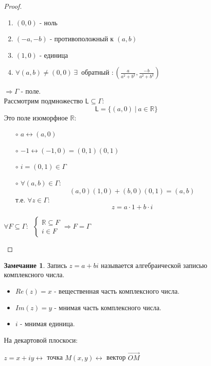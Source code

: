 \documentclass[a4paper, 12pt]{article}
\newcommand{\R}{\mathbb R}
\theoremstyle{definition}
\newtheorem*{remark}{Замечание}
\begin{document}
\begin{proof}
\begin{itemize}
\begin{enumerate}
        \item $(0,0)$ - ноль
        \item $(-a, -b)$ - противоположный к $(a, b)$
        \item $(1, 0)$ - единица
        \item $\forall (a, b) \neq (0, 0) \ \exists \ \text{ обратный }: (\frac{a}{a^2+b^2}, \frac{-b}{a^2+b^2})$
      \end{enumerate} $\Longrightarrow \Gamma$ - поле.\\
      Рассмотрим подмножество $\mathsf{L} \subseteq \Gamma: $  
      $$\mathsf{L}  = \{(a, 0) \ | \ a \in \R \}$$   
      Это поле изоморфное $\R:$
      \begin{itemize}
        \item[$\circ$] $a\longleftrightarrow (a, 0)$
        \item[$\circ$] $-1 \longleftrightarrow (-1, 0) = (0, 1)(0, 1)$
        \item[$\circ$] $i = (0, 1) \in \Gamma$
        \item[$\circ$] $\forall (a, b) \in \Gamma: $
        $$(a, 0)(1, 0) + (b, 0)(0, 1) = (a, b)$$
        т.е. $\forall z \in \Gamma:$ 
        $$z = a \cdot 1 + b \cdot i$$
      \end{itemize}
      $\forall F \subseteq \Gamma: \ $
         $\begin{cases}
        \R \subseteq F \\
        i \in F
      \end{cases} \Longrightarrow F = \Gamma$
    \end{itemize}
  \end{proof} 
  \begin{remark}
    Запись $z=a+bi$ называется алгебраической записью комплексного числа.
    \begin{itemize}
      \item $Re (z) = x$ - вещественная часть комплексного числа.
      \item $Im (z) = y$ - мнимая часть комплексного числа.
      \item $i$ - мнимая единица.
    \end{itemize}
    На декартовой плоскоси: 
    \begin{center}
    \end{center}
    \begin{center}
      $z = x + iy \longleftrightarrow $ точка $M(x,y) \longleftrightarrow$ вектор $\overrightarrow{OM}$
    \end{center} 
  \end{remark}  
\end{document}
